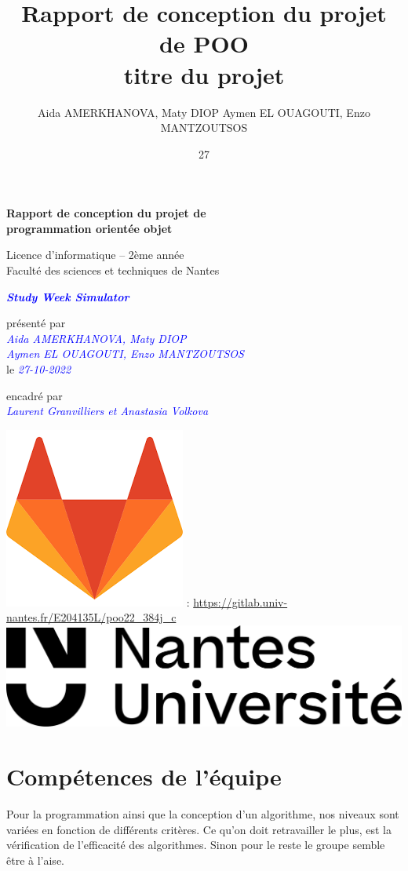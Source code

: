 \documentclass[12pt]{article}
\title{{\bf Rapport de conception du projet de POO}\\[3mm]
{\large titre du projet}}
\author{Aida AMERKHANOVA, Maty DIOP 
Aymen EL OUAGOUTI, Enzo MANTZOUTSOS}
\date{27}
\newcommand{\com}[1]{{\textcolor{blue}{\it #1}}}
\begin{document}
\thispagestyle{empty}

{\Large\bf Rapport de conception du projet de\\[1mm]
  programmation orientée objet}

\vspace*{20mm}

{\large Licence d'informatique -- 2ème année\\[1mm]
  Faculté des sciences et techniques de Nantes}

\vspace*{20mm}

{\Large\bf \com{Study Week Simulator}}

\vspace*{20mm}

{\large présenté par\\[1mm]
  \com{Aida AMERKHANOVA, Maty DIOP\\[1mm] 
  Aymen EL OUAGOUTI, Enzo MANTZOUTSOS}\\[1mm]
  le \com{27-10-2022}}

\vspace*{20mm}

{\large encadré par\\[1mm]
  \com{Laurent Granvilliers et Anastasia Volkova}}

\vspace*{25mm}
\includegraphics[width=.03\textwidth]{gitlab_logo.png}
:
\url{https://gitlab.univ-nantes.fr/E204135L/poo22_384j_c}\\[1mm]

\vfill
\includegraphics[width=.3\textwidth]{logo_nu.png}

\newpage
\section{Compétences de l'équipe}
\setlength\parindent{24pt}
\par{\vspace*{.5mm} Pour la programmation ainsi que la conception d’un algorithme, nos niveaux sont variées en fonction de différents critères. Ce qu’on doit retravailler le plus, est la vérification de l’efficacité des algorithmes. Sinon pour le reste le groupe semble être à l’aise.}
\end{document}
